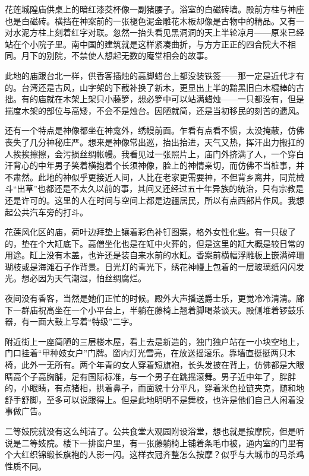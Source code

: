 \par 花莲城隍庙供桌上的暗红漆茭杯像一副猪腰子。浴室的白磁砖墙。殿前方柱与神座也是白磁砖。横挡在神案前的一张褪色泥金雕花木板却像是古物中的精品。又有一对水泥方柱上刻着红字对联。忽然一抬头看见黑洞洞的天上半轮凉月——原来已经站在个小院子里。南中国的建筑就是这样紧凑曲折，与方方正正的四合院大不相同。月下的别院，不禁使人想起无数的庵堂相会的故事。
\par 此地的庙跟台北一样，供香客插烛的高脚蜡台上都没装铁签——那一定是近代才有的。台湾还是古风，山字架的下截补换了新木，更显出上半的黯黑旧白木棍棒的古拙。有的庙就在木架上架只小藤箩，想必箩中可以站满蜡烛——一只都没有，但是揣度木架的部位与高矮，不会不是烛台。因陋就简，还是当初移民的刻苦的遗风。
\par 还有一个特点是神像都坐在神龛外，绣幔前面。乍看有点看不惯，太没掩蔽，仿佛丧失了几分神秘庄严。想来是神像常出巡，抬出抬进，天气又热，挥汗出力搬扛的人挨挨擦擦，会污损丝绸帐幔。我看见过一张照片上，庙门外挤满了人，一个穿白汗背心的中年男子笑着横抱着个长须神像，脸上的神情亲切，而仿佛不当桩事，并不肃然。此地的神似乎更接近人间，人比在老家更需要神，不但背乡离井，同荒械斗“出草”也都还是不太久以前的事，其间又还经过五十年异族的统治，只有宗教是还是许可的。这里的人在时间与空间上都是边疆居民，所以有点西部片作风。我想起公共汽车旁的打斗。
\par 花莲风化区的庙，荷叶边拜垫上镶着彩色补钉图案，格外女性化些。有一只破了的，垫在个大缸底下。高僧坐化也是在缸中火葬的，但是这里的缸大概是较日常的用途。缸上没有木盖，也许还是装自来水前的水缸。香案前横幅浮雕板上嵌满碎珊瑚枝或是海滩石子作背景。日光灯的青光下，绣花神幔上包着的一层玻璃纸闪闪发光。想必因为天气潮湿，怕丝绸腐烂。
\par 夜间没有香客，当然是她们正忙的时候。殿外大声播送爵士乐，更觉冷冷清清。廊下一群庙祝高坐在一个小平台上，半躺在藤椅上翘着脚喝茶谈天。殿侧堆着锣鼓乐器，有一面大鼓上写着“特级”二字。
\par 附近街上一座简陋的三层楼木屋，看上去是新造的，独门独户站在一小块空地上，门口挂着“甲种妓女户”门牌。窗内灯光雪亮，在放送摇滚乐。靠墙直挺挺两只木椅，此外一无所有。两个年青的女人穿着短旗袍，长头发披在背上，仿佛都是大眼睛高个子高胸脯，足有国际标准，与一个男子在跳摇滚舞。男子近中年了，胖胖的，小眼睛，有点猪相，拱着鼻子，而面貌十分平凡，穿着米色拉链夹克，随和地舒手舒脚，至多可以说跟得上。但是此地明明不是舞校，也许是他们自己人闲着没事做广告。
\par 二等妓院就没有这么纯洁了。公共食堂大观园附设浴堂，想也就是按摩院，但是听说是二等妓院。楼下一排窗户里，有一张藤躺椅上铺着条毛巾被，通内室的门里有个大红织锦缎长旗袍的人影一闪。这样衣冠齐整怎么按摩？似乎与大城市的马杀鸡性质不同。

